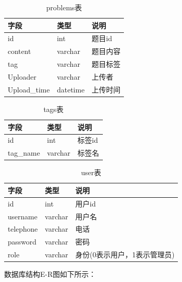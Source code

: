 \documentclass[a4paper,AutoFakeBold={2.7}]{ctexart} %
\begin{document}
\begin{table}[H]
	\caption{problems表}\label{problems表}
	\centering
	\begin{tabular}{p{3cm}<{\centering} p{3cm}<{\centering} p{3cm}<{\centering}}
		\toprule[1.5pt]
		字段&类型&说明\\
		\midrule[0.75pt]
		id&int&题目id\\
		content&varchar&题目内容\\
		tag&varchar&题目标签\\
		Uploader&varchar&上传者\\
		Upload\_time&datetime&上传时间\\
		\bottomrule[1pt]
	\end{tabular}
\end{table}

\begin{table}[H]
	\caption{tags表}\label{tags表}
	\centering
	\begin{tabular}{p{3cm}<{\centering} p{3cm}<{\centering} p{3cm}<{\centering}}
		\toprule[1.5pt]
		字段&类型&说明\\
		\midrule[0.75pt]
		id&int&标签id\\
		tag\_name&varchar&标签名\\
		\bottomrule[1pt]
	\end{tabular}
\end{table}

\begin{table}[H]
	\caption{user表}\label{user表}
	\centering
	\begin{tabular}{p{3cm}<{\centering} p{3cm}<{\centering} p{3cm}<{\centering}}
		\toprule[1.5pt]
		字段&类型&说明\\
		\midrule[0.75pt]
		id&int&用户id\\
		username&varchar&用户名\\
		telephone&varchar&电话\\
		password&varchar&密码\\
		role&varchar&身份(0表示用户，1表示管理员)\\
		\bottomrule[1pt]
	\end{tabular}
\end{table}

数据库结构E-R图如下所示：
\end{document}
